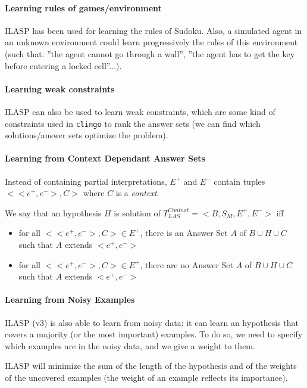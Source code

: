 \paragraph{Learning rules of games/environment}

ILASP has been used for learning the rules of Sudoku. Also, a simulated agent in an unknown environment could learn progressively the rules of this environment (such that: ”the agent cannot go through a wall”, ”the agent has to get the key before entering a locked cell”...).

\paragraph{Learning weak constraints}

ILASP can also be used to learn weak constraints, which are some kind of constraints used in \texttt{clingo} to rank the answer sets (we can find which solutions/answer sets optimize the problem).

\paragraph{Learning from Context Dependant Answer Sets} 

Instead of containing partial interpretations, $E^+$ and $E^-$ contain tuples $<<e^+,e^->,C>$ where $C$ is a \textit{context}. 

\smallskip

We say that an hypothesis $H$ is solution of $T^{Context}_{LAS}=<B,S_M,E^+,E^->$ iff
\begin{itemize}
\item for all $<< e^+ , e^->, C >\in E^+$, there is an Answer Set $A$ of $B \cup H \cup C$ such that $A$ extends $< e^+ , e^- >$


\item for all $<< e^+ , e^->, C >\in E^+$, there are no Answer Set $A$ of $B \cup H \cup C$ such that $A$ extends $< e^+ , e^- >$

\end{itemize}

\paragraph{Learning from Noisy Examples}

ILASP (v3) is also able to learn from noisy data: it can learn an hypothesis that covers a majority (or the most important) examples. To do so, we need to specify which examples are in the noisy data, and we give a weight to them. 

\smallskip

ILASP will minimize the sum of the length of the hypothesis and of the weights of the uncovered examples (the weight of an example reflects its importance).


